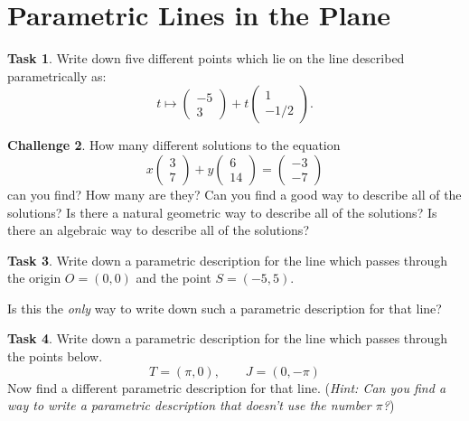 \documentclass{tufte-book}
\theoremstyle{definition}
\newtheorem{task}{Task}
\newtheorem{challenge}[task]{Challenge}
\begin{document}
\section*{Parametric Lines in the Plane}

\begin{task}
Write down five different points which lie on the line described parametrically as:
\[
t \mapsto \begin{pmatrix} -5\\3 \end{pmatrix} + t \begin{pmatrix}1\\-1/2\end{pmatrix}.
\]
\end{task}


\begin{challenge}
How many different solutions to the equation
\[
x\begin{pmatrix} 3 \\ 7\end{pmatrix} + y \begin{pmatrix} 6 \\ 14 \end{pmatrix}
= \begin{pmatrix} -3 \\ -7 \end{pmatrix}
\]
can you find? How many are they? Can you find a good way to describe all of the solutions? Is there a natural geometric way to describe all of the solutions? Is there an algebraic way to describe all of the solutions?
\end{challenge}


\begin{task}\label{task:line-through-origin}
Write down a parametric description for the line which passes through the origin $O=(0,0)$ and the 
point $S = (-5,5)$.

Is this the \emph{only} way to write down such a parametric description for that line?
\end{task}


\begin{task}\label{task:line-through-points}
Write down a parametric description for the line which passes through the points below.
\[
 T = (\pi, 0), \qquad J = (0,-\pi)
\]
Now find a different parametric description for that line. (\emph{Hint: Can you find a way to write a parametric description that doesn't use the number $\pi$?})
\end{task}
\end{document}
